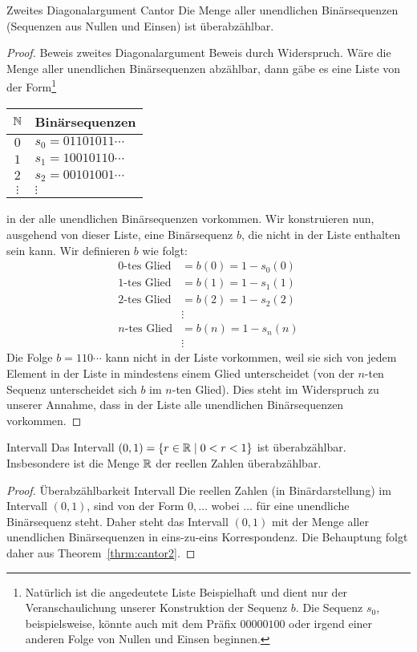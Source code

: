 \begin{theorem}{Zweites Diagonalargument Cantor}
Die Menge aller unendlichen Binärsequenzen (Sequenzen aus Nullen und Einsen) ist überabzählbar.
\end{theorem}
\begin{proof}{Beweis zweites Diagonalargument}
Beweis durch Widerspruch. Wäre die Menge aller unendlichen Binärsequenzen abzählbar, dann gäbe es eine Liste von der Form\footnote{Natürlich ist die angedeutete Liste Beispielhaft und dient nur der Veranschaulichung unserer Konstruktion der Sequenz $b$. Die Sequenz $s_0$, beispielsweise, könnte auch mit dem Präfix $00000100$ oder irgend einer anderen Folge von Nullen und Einsen beginnen. }
\begin{center}
\begin{tabular}{c|l}
$\mathbb{N}$ & Binärsequenzen\\
\hline
$0$ & $s_0=01101011\cdots$\\
$1$ & $s_1=10010110\cdots$\\
$2$ & $s_2=00101001\cdots$\\
$\vdots$ & $\vdots$
\end{tabular}
\end{center}
in der alle unendlichen Binärsequenzen vorkommen. Wir konstruieren nun, ausgehend von dieser Liste, eine Binärsequenz $b$, die nicht in der Liste enthalten sein kann. Wir definieren $b$ wie folgt:
\begin{align*}
0\text{-tes Glied}&=b(0)=1-s_0(0)\\
1\text{-tes Glied}&=b(1)=1-s_1(1)\\
2\text{-tes Glied}&=b(2)=1-s_2(2)\\
&\vdots\\
n\text{-tes Glied}&=b(n)=1-s_n(n)\\
&\vdots
\end{align*}
Die Folge $b=110\cdots$ kann nicht in der Liste vorkommen, weil sie sich von jedem Element in der Liste in mindestens einem Glied unterscheidet (von der $n$-ten Sequenz unterscheidet sich $b$ im $n$-ten Glied). Dies steht im Widerspruch zu unserer Annahme, dass in der Liste alle unendlichen Binärsequenzen vorkommen.
\end{proof}


\begin{corollary}{Intervall}
Das Intervall $(0,1)=\{r\in\mathbb{R}\mid 0<r<1 \}$ ist überabzählbar. Insbesondere ist die Menge $\mathbb{R}$ der reellen Zahlen überabzählbar.
\end{corollary}
\begin{proof}{Überabzählbarkeit Intervall}
Die reellen Zahlen (in Binärdarstellung) im Intervall $(0,1)$, sind von der Form $0,\dots$ wobei $\dots$ für eine unendliche Binärsequenz steht. Daher steht das Intervall $(0,1)$ mit der Menge aller unendlichen Binärsequenzen in eins-zu-eins Korrespondenz. Die Behauptung folgt daher aus Theorem~\ref{thrm:cantor2}.
\end{proof}

